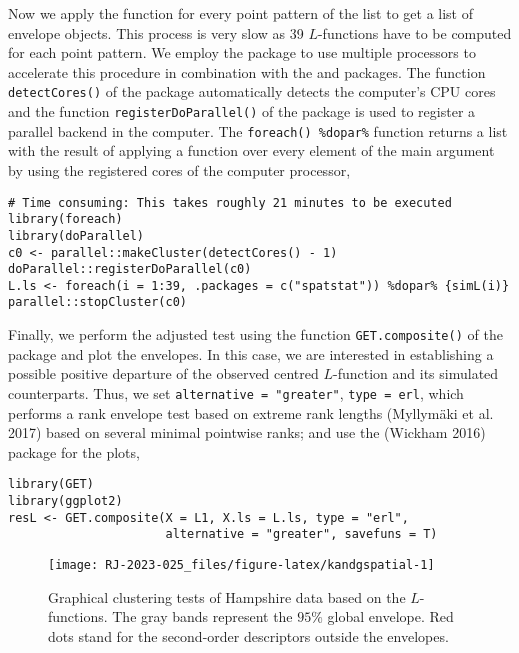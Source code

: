 Now we apply the function for every point pattern of the list to get a list of envelope objects. This process is very slow as 39 \(L\)-functions have to be computed for each point pattern. We employ the package  to use multiple processors to accelerate this procedure in combination with the  and  packages. The function \texttt{detectCores()} of the package  automatically detects the computer's CPU cores and the function \texttt{registerDoParallel()} of the  package is used to register a parallel backend in the computer. The \texttt{foreach()\ \%dopar\%} function returns a list with the result of applying a function over every element of the main argument by using the registered cores of the computer processor,

\begin{verbatim}
# Time consuming: This takes roughly 21 minutes to be executed 
library(foreach)
library(doParallel)
c0 <- parallel::makeCluster(detectCores() - 1)
doParallel::registerDoParallel(c0)
L.ls <- foreach(i = 1:39, .packages = c("spatstat")) %dopar% {simL(i)}
parallel::stopCluster(c0)
\end{verbatim}

Finally, we perform the adjusted test using the function \texttt{GET.composite()} of the  package and plot the envelopes. In this case, we are interested in establishing a possible positive departure of the observed centred \(L\)-function and its simulated counterparts. Thus, we set \texttt{alternative\ =\ "greater"}, \texttt{type\ =\ \textquotesingle{}erl\textquotesingle{}}, which performs a rank envelope test based on extreme rank lengths (Myllymäki et al. 2017) based on several minimal pointwise ranks; and use the  (Wickham 2016) package for the plots,

\begin{verbatim}
library(GET)
library(ggplot2)
resL <- GET.composite(X = L1, X.ls = L.ls, type = "erl", 
                      alternative = "greater", savefuns = T)
\end{verbatim}

\begin{figure}

{\centering \texttt{[image: RJ-2023-025\_files/figure-latex/kandgspatial-1]} 

}

\caption{Graphical clustering tests of Hampshire data based on the $L$-functions. The gray bands represent the $95\%$ global envelope. Red dots stand for the second-order descriptors outside the envelopes.}\label{fig:kandgspatial}
\end{figure}

